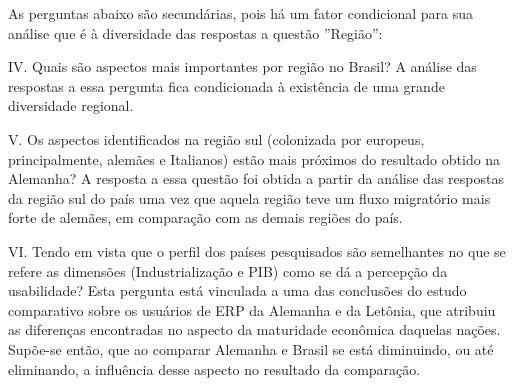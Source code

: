As perguntas abaixo são secundárias, pois há um fator condicional para sua análise que é à diversidade das respostas a questão ”Região”:

	\begin{flushright}
	\begin{minipage}{.955\textwidth}
		IV.	Quais são aspectos mais importantes por região no Brasil? \newline
		A análise das respostas a essa pergunta fica condicionada à existência de uma grande diversidade regional.
		
	\end{minipage}
	\end{flushright}

	\begin{flushright}
	\begin{minipage}{.955\textwidth}
		V.	Os aspectos identificados na região sul (colonizada por europeus, principalmente, alemães e Italianos) estão mais próximos do resultado obtido na Alemanha? \newline
		A resposta a essa questão foi obtida a partir da análise das respostas da região sul do país uma vez que aquela região teve um fluxo migratório mais forte de alemães, em comparação com as demais regiões do país.
		
	\end{minipage}
	\end{flushright}


	\begin{flushright}
	\begin{minipage}{.955\textwidth}
		VI.	Tendo em vista que o perfil dos países pesquisados são semelhantes no que se refere as dimensões (Industrialização e PIB) como se dá a percepção da usabilidade? \newline
		Esta pergunta está vinculada a uma das conclusões do estudo comparativo sobre os usuários de ERP da Alemanha e da Letônia, que atribuiu as diferenças encontradas no aspecto da maturidade econômica daquelas nações. Supõe-se então, que ao comparar Alemanha e Brasil se está diminuindo, ou até eliminando, a influência desse aspecto no resultado da comparação.
		
	\end{minipage}
	\end{flushright}

